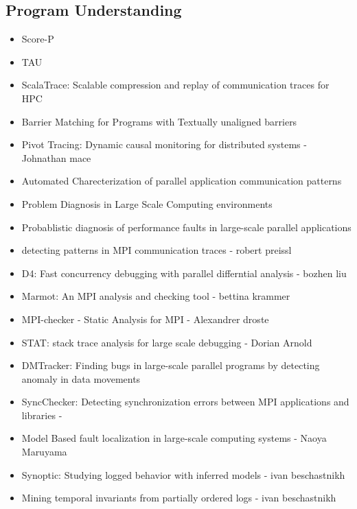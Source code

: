 


\subsection{Program Understanding }



\begin{itemize}
\item Score-P \cite{scorep}
\item TAU \cite{tau}
\item ScalaTrace: Scalable compression and replay of communication traces for HPC  \cite{scalatrace}
\item Barrier Matching for Programs with Textually unaligned barriers \cite{zhang07}
\item Pivot Tracing: Dynamic causal monitoring for distributed systems - Johnathan mace \cite{pivot}
\item Automated Charecterization of parallel application communication patterns \cite{roth-15}
\item Problem Diagnosis in Large Scale Computing environments \cite{miller06}
\item Probablistic diagnosis of performance faults in large-scale parallel applications \cite{laguna-12}
\item detecting patterns in MPI communication traces - robert preissl \cite{preissl-08}
\item D4: Fast concurrency debugging with parallel differntial analysis - bozhen liu \cite{liu-18}
\item Marmot: An MPI analysis and checking tool - bettina krammer \cite{marmot}
\item MPI-checker - Static Analysis for MPI - Alexandrer droste \cite{mpi-checker}
\item STAT: stack trace analysis for large scale debugging - Dorian Arnold \cite{stat}
\item DMTracker: Finding bugs in large-scale parallel programs by detecting anomaly in data movements \cite{dmtracker}
\item SyncChecker: Detecting synchronization errors between MPI applications and libraries - \cite{syncChecker}
\item Model Based fault localization in large-scale computing systems - Naoya Maruyama \cite{satoshi-08}
\item Synoptic: Studying logged behavior with inferred models - ivan beschastnikh \cite{beschastnikh-synoptic}
\item Mining temporal invariants from partially ordered logs -  ivan beschastnikh \cite{beschastnikh-pologs}

\end{itemize}

